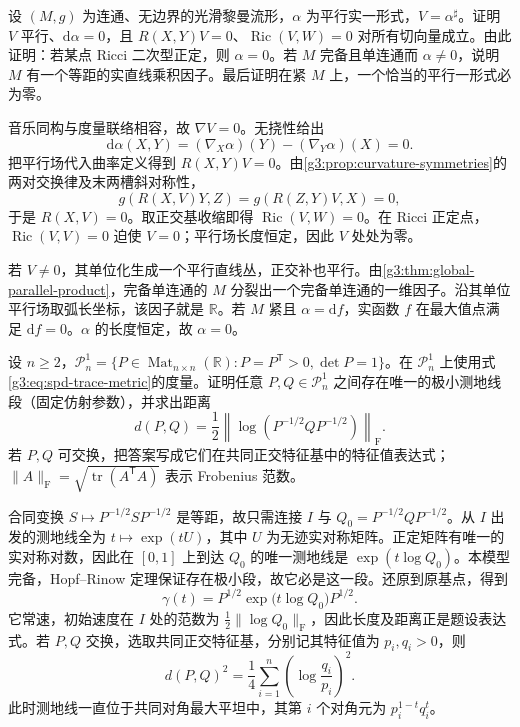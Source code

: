 \begin{exercise}\label{g3:ex:parallel-one-form-ricci}
	设 \((M,g)\) 为连通、无边界的光滑黎曼流形，\(\alpha\) 为平行实一形式，\(V=\alpha^\sharp\)。证明 \(V\) 平行、\(\mathrm d\alpha=0\)，且 \(R(X,Y)V=0\)、\(\operatorname{Ric}(V,W)=0\) 对所有切向量成立。由此证明：若某点 Ricci 二次型正定，则 \(\alpha=0\)。若 \(M\) 完备且单连通而 \(\alpha\ne0\)，说明 \(M\) 有一个等距的实直线乘积因子。最后证明在紧 \(M\) 上，一个恰当的平行一形式必为零。
\end{exercise}
\begin{solution}
	音乐同构与度量联络相容，故 \(\nabla V=0\)。无挠性给出
	\[
		\mathrm d\alpha(X,Y)=(\nabla_X\alpha)(Y)-(\nabla_Y\alpha)(X)=0.
	\]
	把平行场代入曲率定义得到 \(R(X,Y)V=0\)。由\cref{g3:prop:curvature-symmetries}的两对交换律及末两槽斜对称性，
	\[
		g(R(X,V)Y,Z)=g(R(Z,Y)V,X)=0,
	\]
	于是 \(R(X,V)=0\)。取正交基收缩即得 \(\operatorname{Ric}(V,W)=0\)。在 Ricci 正定点，\(\operatorname{Ric}(V,V)=0\) 迫使 \(V=0\)；平行场长度恒定，因此 \(V\) 处处为零。

	若 \(V\ne0\)，其单位化生成一个平行直线丛，正交补也平行。由\cref{g3:thm:global-parallel-product}，完备单连通的 \(M\) 分裂出一个完备单连通的一维因子。沿其单位平行场取弧长坐标，该因子就是 \(\mathbb R\)。若 \(M\) 紧且 \(\alpha=\mathrm df\)，实函数 \(f\) 在最大值点满足 \(\mathrm df=0\)。\(\alpha\) 的长度恒定，故 \(\alpha=0\)。
\end{solution}

\begin{exercise}\label{g3:ex:spd-distance-formula}
	设 \(n\ge2\)，\(\mathcal P_n^1=\{P\in\operatorname{Mat}_{n\times n}(\mathbb R):P=P^{\mathsf T}>0,\det P=1\}\)。在 \(\mathcal P_n^1\) 上使用式\eqref{g3:eq:spd-trace-metric}的度量。证明任意 \(P,Q\in\mathcal P_n^1\) 之间存在唯一的极小测地线段（固定仿射参数），并求出距离
	\[
		d(P,Q)=\frac12\left\lVert\log(P^{-1/2}QP^{-1/2})\right\rVert_{\mathrm F}.
	\]
	若 \(P,Q\) 可交换，把答案写成它们在共同正交特征基中的特征值表达式；\(\|A\|_{\mathrm F}=\sqrt{\operatorname{tr}(A^{\mathsf T}A)}\) 表示 Frobenius 范数。
\end{exercise}
\begin{solution}
	合同变换 \(S\mapsto P^{-1/2}SP^{-1/2}\) 是等距，故只需连接 \(I\) 与 \(Q_0=P^{-1/2}QP^{-1/2}\)。从 \(I\) 出发的测地线全为 \(t\mapsto\exp(tU)\)，其中 \(U\) 为无迹实对称矩阵。正定矩阵有唯一的实对称对数，因此在 \([0,1]\) 上到达 \(Q_0\) 的唯一测地线是 \(\exp(t\log Q_0)\)。本模型完备，Hopf--Rinow 定理保证存在极小段，故它必是这一段。还原到原基点，得到
	\[
		\gamma(t)=P^{1/2}\exp\bigl(t\log Q_0\bigr)P^{1/2}.
	\]
	它常速，初始速度在 \(I\) 处的范数为 \(\tfrac12\lVert\log Q_0\rVert_{\mathrm F}\)，因此长度及距离正是题设表达式。若 \(P,Q\) 交换，选取共同正交特征基，分别记其特征值为 \(p_i,q_i>0\)，则
	\[
		d(P,Q)^2=\frac14\sum_{i=1}^n\left(\log\frac{q_i}{p_i}\right)^2.
	\]
	此时测地线一直位于共同对角最大平坦中，其第 \(i\) 个对角元为 \(p_i^{1-t}q_i^t\)。
\end{solution}

